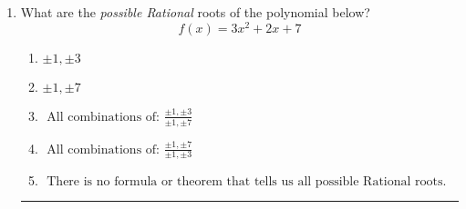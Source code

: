 \documentclass[14pt]{extbook}
\newcommand{\litem}[1]{\item#1\hspace*{-1cm}\rule{\textwidth}{0.4pt}}
\begin{document}
\begin{enumerate}
{\begin{enumerate}[label=\Alph*.]
\end{enumerate} }
\litem{
What are the \textit{possible Rational} roots of the polynomial below?\[ f(x) = 3x^{2} +2 x + 7 \]\begin{enumerate}[label=\Alph*.]
\item \( \pm 1,\pm 3 \)
\item \( \pm 1,\pm 7 \)
\item \( \text{ All combinations of: }\frac{\pm 1,\pm 3}{\pm 1,\pm 7} \)
\item \( \text{ All combinations of: }\frac{\pm 1,\pm 7}{\pm 1,\pm 3} \)
\item \( \text{ There is no formula or theorem that tells us all possible Rational roots.} \)

\end{enumerate} }
\end{enumerate}
\end{document}
